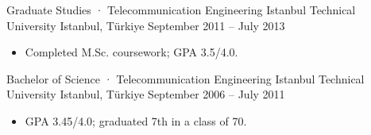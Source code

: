 \resumeSubheading
  {Graduate Studies · Telecommunication Engineering}
  {Istanbul Technical University}
  {Istanbul, Türkiye}
  {September 2011 -- July 2013}
\begin{itemize}
  \item Completed M.Sc. coursework; GPA 3.5/4.0.
\end{itemize}
\vspace{0.2em}

\resumeSubheading
  {Bachelor of Science · Telecommunication Engineering}
  {Istanbul Technical University}
  {Istanbul, Türkiye}
  {September 2006 -- July 2011}
\begin{itemize}
  \item GPA 3.45/4.0; graduated 7th in a class of 70.
\end{itemize}
